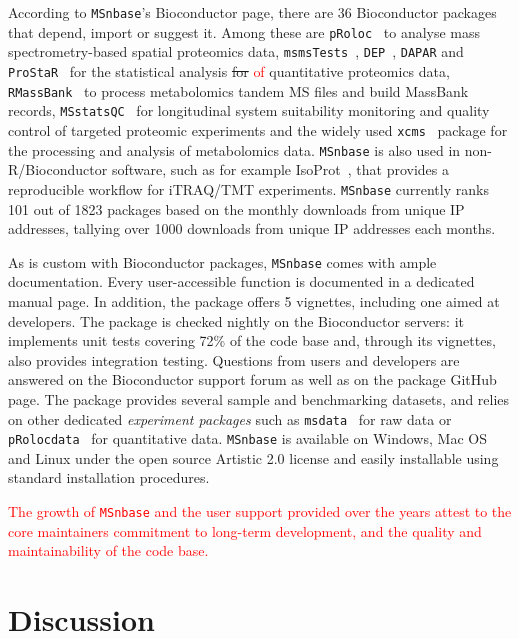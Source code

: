 \documentclass[journal=jacsat,manuscript=article]{achemso}\usepackage[]{graphicx}\usepackage[]{color}
\begin{document}
According to \texttt{MSnbase}'s Bioconductor page, there are 36
Bioconductor packages that depend, import or suggest it. Among these
are \texttt{pRoloc}~\cite{Gatto:2014a} to analyse mass
spectrometry-based spatial proteomics data,
\texttt{msmsTests}~\cite{msmsTests}, \texttt{DEP}~\cite{Zhang:2018},
\texttt{DAPAR} and \texttt{ProStaR}~\cite{Wieczorek:2017} for the
statistical analysis \sout{for} \textcolor{red}{of} quantitative
proteomics data, \texttt{RMassBank}~\cite{Stravs:2013} to process
metabolomics tandem MS files and build MassBank records,
\texttt{MSstatsQC}~\cite{Dogu:2017} for longitudinal system
suitability monitoring and quality control of targeted proteomic
experiments and the widely used \texttt{xcms}~\cite{Smith:2006}
package for the processing and analysis of metabolomics
data. \texttt{MSnbase} is also used in non-R/Bioconductor software,
such as for example IsoProt~\cite{Griss:2019}, that provides a
reproducible workflow for iTRAQ/TMT experiments. \texttt{MSnbase}
currently ranks 101 out of 1823 packages based on the monthly
downloads from unique IP addresses, tallying over 1000 downloads from
unique IP addresses each months. 

As is custom with Bioconductor packages, \texttt{MSnbase} comes with
ample documentation. Every user-accessible function is documented in a
dedicated manual page. In addition, the package offers 5 vignettes,
including one aimed at developers. The package is checked nightly on
the Bioconductor servers: it implements unit tests covering 72\% of
the code base and, through its vignettes, also provides integration
testing. Questions from users and developers are answered on the
Bioconductor support forum as well as on the package GitHub page. The
package provides several sample and benchmarking datasets, and relies
on other dedicated \textit{experiment packages} such as
\texttt{msdata}~\cite{msdata} for raw data or
\texttt{pRolocdata}~\cite{Gatto:2014a} for quantitative
data. \texttt{MSnbase} is available on Windows, Mac OS and Linux under
the open source Artistic 2.0 license and easily installable using
standard installation procedures.


\textcolor{red}{The growth of \texttt{MSnbase} and the user support
  provided over the years attest to the core maintainers commitment to
  long-term development, and the quality and maintainability of the
  code base.}

\section{Discussion}
\end{document}
